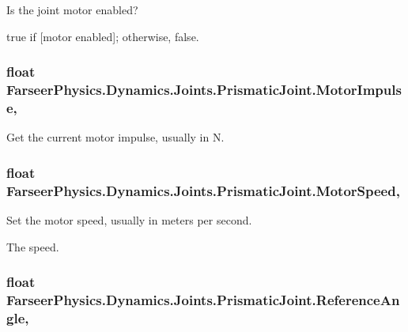 Is the joint motor enabled? 

{\ttfamily true} if \mbox{[}motor enabled\mbox{]}; otherwise, {\ttfamily false}.\hypertarget{class_farseer_physics_1_1_dynamics_1_1_joints_1_1_prismatic_joint_a8913389dfc0e78dedffe38abf569b3cf}{
\subsubsection[{Motor\+Impulse}]{\setlength{\rightskip}{0pt plus 5cm}float Farseer\+Physics.\+Dynamics.\+Joints.\+Prismatic\+Joint.\+Motor\+Impulse\hspace{0.3cm}{\ttfamily [get]}, {\ttfamily [set]}}}\label{class_farseer_physics_1_1_dynamics_1_1_joints_1_1_prismatic_joint_a8913389dfc0e78dedffe38abf569b3cf}


Get the current motor impulse, usually in N. 

\hypertarget{class_farseer_physics_1_1_dynamics_1_1_joints_1_1_prismatic_joint_adf5459361569cddd36123b406627b791}{
\subsubsection[{Motor\+Speed}]{\setlength{\rightskip}{0pt plus 5cm}float Farseer\+Physics.\+Dynamics.\+Joints.\+Prismatic\+Joint.\+Motor\+Speed\hspace{0.3cm}{\ttfamily [get]}, {\ttfamily [set]}}}\label{class_farseer_physics_1_1_dynamics_1_1_joints_1_1_prismatic_joint_adf5459361569cddd36123b406627b791}


Set the motor speed, usually in meters per second. 

The speed.\hypertarget{class_farseer_physics_1_1_dynamics_1_1_joints_1_1_prismatic_joint_a94a32ba9c7ca17df0ce648daa91ee673}{
\subsubsection[{Reference\+Angle}]{\setlength{\rightskip}{0pt plus 5cm}float Farseer\+Physics.\+Dynamics.\+Joints.\+Prismatic\+Joint.\+Reference\+Angle\hspace{0.3cm}{\ttfamily [get]}, {\ttfamily [set]}}}\label{class_farseer_physics_1_1_dynamics_1_1_joints_1_1_prismatic_joint_a94a32ba9c7ca17df0ce648daa91ee673}


